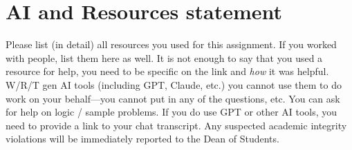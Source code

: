 \section*{AI and Resources statement}

Please list (in detail) all resources you used for this assignment. If
you worked with people, list them here as well. It is not enough to say
that you used a resource for help, you need to be specific on the link
and \emph{how} it was helpful. W/R/T gen AI tools (including GPT,
Claude, etc.) you cannot use them to do work on your behalf---you
cannot put in any of the questions, etc. You can ask for help on logic
/ sample problems. If you do use GPT or other AI tools, you need to
provide a link to your chat transcript. Any suspected academic
integrity violations will be immediately reported to the Dean of
Students.
